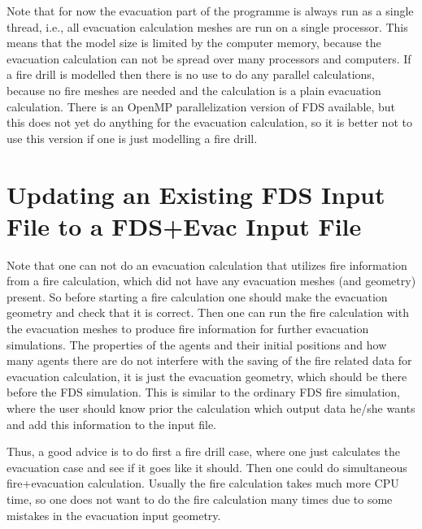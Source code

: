 \documentclass[12pt,a4paper,final,twoside]{stylevk}
\begin{document}
Note that for now the evacuation part of the programme is always run
as a single thread, i.e., all evacuation calculation meshes are
run on a single processor.  This means that the model size is limited
by the computer memory, because the evacuation calculation can not be
spread over many processors and computers.  If a fire drill is
modelled then there is no use to do any parallel calculations, because
no fire meshes are needed and the calculation is a plain evacuation
calculation.  There is an OpenMP parallelization version of FDS
available, but this does not yet do anything for the evacuation
calculation, so it is better not to use this version if one is just
modelling a fire drill.


\section{Updating an Existing FDS Input File to a FDS+Evac Input
  File}\label{Sec_UpdatingInput} 

Note that one can not do an evacuation calculation that utilizes fire
information from a fire calculation, which did not have any evacuation
meshes (and geometry) present.  So before starting a fire calculation
one should make the evacuation geometry and check that it is correct.
Then one can run the fire calculation with the evacuation meshes to
produce fire information for further evacuation simulations.  The
properties of the agents and their initial positions and how many
agents there are do not interfere with the saving of the fire related
data for evacuation calculation, it is just the evacuation geometry,
which should be there before the FDS simulation.  This is similar to
the ordinary FDS fire simulation, where the user should know prior the
calculation which output data he/she wants and add this information to
the input file.


Thus, a good advice is to do first a fire drill case, where one just
calculates the evacuation case and see if it goes like it should.
Then one could do simultaneous fire+evacuation calculation.  Usually
the fire calculation takes much more CPU time, so one does not want to
do the fire calculation many times due to some mistakes in the
evacuation input geometry.
\end{document}
